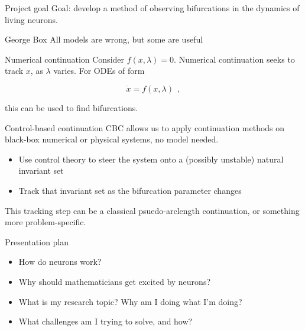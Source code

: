 \documentclass[aspectratio=169]{beamer}
\begin{document}
\begin{frame}[label={sec:orgdead0e3}]{Project goal}
Goal: develop a method of observing bifurcations in the dynamics of living neurons.


\vspace{1cm}
\begin{block}{George Box}
All models are wrong, but some are useful
\end{block}
\end{frame}


\begin{frame}[label={sec:orgb87e419}]{Numerical continuation}
Consider \(f(x,\lambda)=0\).
Numerical continuation seeks to track \(x\), as \(\lambda\) varies.
For ODEs of form

$$\dot{x} = f(x,\lambda)~~,$$

this can be used to find bifurcations.
\end{frame}


\begin{frame}[label={sec:org3c374c7}]{Control-based continuation}
CBC allows us to apply continuation methods on black-box numerical or physical systems, no model needed.

\begin{itemize}
\item Use control theory to steer the system onto a (possibly unstable) natural invariant set
\item Track that invariant set as the bifurcation parameter changes
\end{itemize}

This tracking step can be a classical psuedo-arclength continuation, or something more problem-specific.
\end{frame}



\begin{frame}[label={sec:org61c3a39}]{Presentation plan}
\begin{itemize}
    \item How do neurons work?
    \item Why should mathematicians get excited by neurons?
    \item What is my research topic? Why am I doing what I'm doing?
    \item \alert{ What challenges am I trying to solve, and how?}
\end{itemize}
\end{frame}
\end{document}
